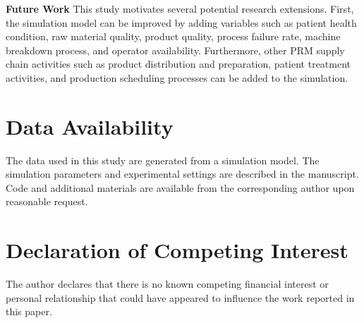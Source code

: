 \documentclass[preprint,review,12pt,nonatbib]{elsarticle}
\begin{document}
\textbf{Future Work}
This study motivates several potential research extensions. First, the simulation
model can be improved by adding variables such as patient health condition, raw material quality, product quality, process failure rate, machine breakdown process, and operator availability. Furthermore, other PRM supply chain activities such as product
distribution and preparation, patient treatment activities, and production scheduling processes can be added to the simulation.

\section*{Data Availability}
The data used in this study are generated from a simulation model. The simulation parameters and experimental settings are described in the manuscript. Code and additional materials are available from the corresponding author upon reasonable request.

\section*{Declaration of Competing Interest}
The author declares that there is no known competing financial interest or personal relationship that could have appeared to influence the work reported in this paper.

\printbibliography
\end{document}
